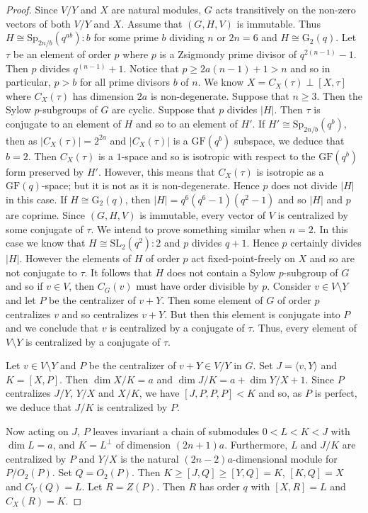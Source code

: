 \documentclass[12pt]{amsart}
\theoremstyle{remark}
\theoremstyle{notation}
\theoremstyle{definition}
\newcommand{\GF}{\mathrm{GF}}
\newcommand{\Sp}{\mathrm{Sp}}
\newcommand{\SL}{\mathrm{SL}}
\newcommand{\0}{\emptyset}
\begin{document}
\begin{proof}
   Since $V/Y$ and $X$ are  natural modules, $G$ acts transitively on the non-zero vectors of both $V/Y$ and $X$. Assume that $(G,H,V)$ is immutable. Thus $H\cong \Sp_{2n/b}(q^{ab}){:}b$ for some prime $b$ dividing $n$ or $2n=6$ and $H \cong \mathrm G_2(q)$. Let $\tau$ be an element of order $p$ where $p$ is a Zsigmondy prime divisor of $q^{2(n-1)}-1$. Then $p$ divides $q^{(n-1)}+1$. Notice that $p \ge 2a(n-1)+1>n$ and   so in particular, $p > b$ for all prime divisors $b$ of $n$.
   We know $X= C_X(\tau)\perp [X,\tau]$ where $C_X(\tau)$ has dimension $2a$ is non-degenerate. Suppose that $n \ge 3$. Then the Sylow $p$-subgroups of $G$ are cyclic.
    Suppose that $p$ divides $|H|$. Then  $\tau$ is conjugate to an element of $H$ and so to an element of $H'$. If $H'\cong \Sp_{2n/b}(q^b)$, then as $|C_X(\tau)|= 2^{2a}$ and $|C_X(\tau)|$ is a $\GF(q^b)$ subspace, we deduce that $b=2$. Then $C_X(\tau)$ is a $1$-space and so is isotropic with respect to the $\GF(q^b)$ form preserved by  $H'$. However, this means that $C_X(\tau)$ is isotropic as a $\GF(q)$-space; but it is not as it is non-degenerate. Hence $p$ does not divide $|H |$ in this case. If $H\cong \mathrm G_2(q)$, then $|H|=q^6(q^6-1)(q^2-1)$ and so $|H|$  and $p$ are coprime. Since $(G,H,V)$ is immutable, every vector of $V$ is centralized by some conjugate of $\tau$. We intend to prove something similar when $n=2$.  In this case we know that $H\cong \SL_2(q^2){:}2$ and $p$ divides $q+1$. Hence $p$ certainly divides $|H|$. However the elements of $H$ of order $p$ act fixed-point-freely on $X$ and so are not conjugate to $\tau$. It follows that $H$ does not contain a Sylow $p$-subgroup of $G$ and so if $v\in V$, then $C_G(v)$ must have order divisible by $p$. Consider $v \in V \setminus Y$ and let $P$ be the centralizer of $v+Y$. Then some element of $G$ of order $p$ centralizes $v$ and so centralizes $v+Y$. But then this element is conjugate into $P$ and we conclude that $v$ is centralized by a conjugate of $\tau$.  Thus, every element of $V\setminus Y$ is centralized by a conjugate of $\tau$.





 Let $v \in V \setminus Y$ and $P$ be the centralizer of $v+Y\in V/Y$ in $G$.  Set $J= \langle v,Y\rangle$ and $K=[X,P]$.  Then $\dim X/K = a$ and $\dim J/K=a+\dim Y/X+1$. Since $P$ centralizes $J/Y$, $Y/X$ and $X/K$, we have $[J,P,P,P]<K$  and so, as $P$ is perfect,  we deduce that $J/K$ is centralized by $P$.

 Now acting on  $J$, $P$ leaves invariant a chain of submodules $0<L<K<J$ with $\dim L=a$, and $K=L^\perp$ of dimension $(2n+1)a$.  Furthermore, $L$ and $J/K$ are centralized by $P$ and $Y/X$ is the natural $(2n-2)a$-dimensional module for $P/O_2(P)$. Set $Q= O_2(P)$.  Then $K\ge [J,Q]\ge [Y,Q]=K$, $[K,Q]=X$ and $C_Y(Q)=L$. Let $R= Z(P)$. Then $R$ has order $q$ with $[X,R]=L$ and $C_X(R)=K$.


\end{proof}
\end{document}
